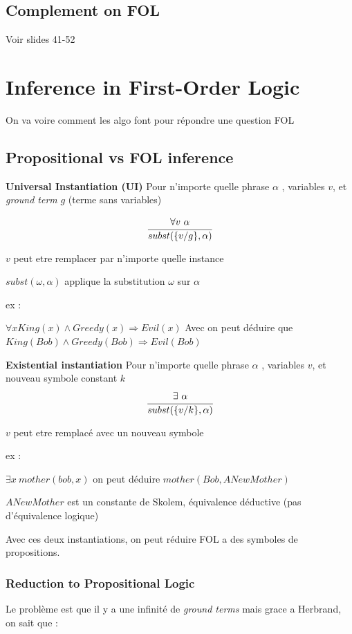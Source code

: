 \documentclass[12pt]{article}
\begin{document}
	\subsection{Complement on FOL}
		Voir slides 41-52
		
\newpage
\section{Inference in First-Order Logic}
	On va voire comment les algo font pour répondre une question FOL
	\subsection{Propositional vs FOL inference}
		\textbf{Universal Instantiation (UI)} Pour n'importe quelle phrase $\alpha$ , variables $v$, et \textit{ground term} $g$ (terme sans variables)
		
		\begin{equation}
			\cfrac{\forall v \ \alpha}{subst(\{v/g\}, \alpha)}
		\end{equation}
		
		$v$ peut etre remplacer par n'importe quelle instance

		$subst(\omega,\alpha)$ applique la substitution $\omega$ sur $\alpha$
		
		ex : 
		
		$\forall x King(x) \land Greedy(x) \Rightarrow Evil(x)$ Avec on peut déduire que $King(Bob) \land Greedy(Bob) \Rightarrow Evil(Bob)$
		
		\textbf{Existential instantiation}
		Pour n'importe quelle phrase $\alpha$ , variables $v$, et nouveau symbole constant $k$
			\begin{equation}
				\cfrac{\exists \ \alpha}{subst(\{v/k\}, \alpha)}
			\end{equation}
		
		$v$ peut etre remplacé avec un nouveau symbole
		
		ex :
		
		$\exists x  \ mother(bob,x)$ on peut déduire $mother(Bob, ANewMother)$
		
		$ANewMother$ est un constante de Skolem, équivalence déductive (pas d'équivalence logique)
		
		Avec ces deux instantiations, on peut réduire FOL a des symboles de propositions.
		
		\subsubsection{Reduction to Propositional Logic}	
			Le problème est que il y a une infinité de \textit{ground terms} mais grace a Herbrand, on sait que :
			
\end{document}
